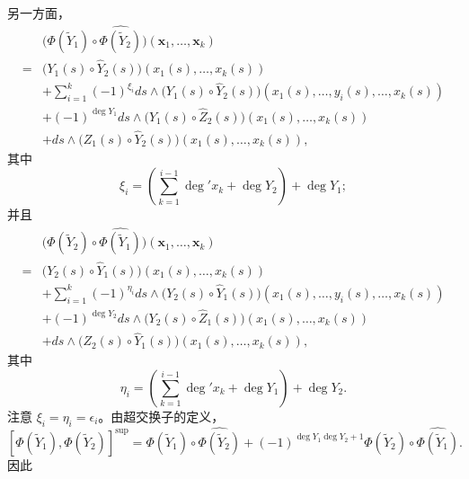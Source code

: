 另一方面，
\begingroup\small
\[
\begin{aligned}
 &\bigl(\Phi(\widetilde Y_1)\circ
   \widehat{\Phi(\widetilde Y_2)}\bigr)
   (\mathbf x_1,\ldots,\mathbf x_k)\\
={}&\bigl(Y_1(s)\circ\widehat Y_2(s)\bigr)
    (x_1(s),\ldots,x_k(s))\\
 &+\sum_{i=1}^k(-1)^{\xi_i}ds\wedge
   \bigl(Y_1(s)\circ\widehat Y_2(s)\bigr)
   (x_1(s),\ldots,y_i(s),\ldots,x_k(s))\\
 &+(-1)^{\deg Y_1}ds\wedge
   \bigl(Y_1(s)\circ\widehat Z_2(s)\bigr)
   (x_1(s),\ldots,x_k(s))\\
 &+ds\wedge\bigl(Z_1(s)\circ\widehat Y_2(s)\bigr)
   (x_1(s),\ldots,x_k(s)),
\end{aligned}
\]
\endgroup
其中
\[
 \xi_i=\left(\sum_{k=1}^{i-1}\deg' x_k+\deg Y_2\right)+\deg Y_1;
\]
并且
\begingroup\small
\[
\begin{aligned}
 &\bigl(\Phi(\widetilde Y_2)\circ
   \widehat{\Phi(\widetilde Y_1)}\bigr)
   (\mathbf x_1,\ldots,\mathbf x_k)\\
={}&\bigl(Y_2(s)\circ\widehat Y_1(s)\bigr)
    (x_1(s),\ldots,x_k(s))\\
 &+\sum_{i=1}^k(-1)^{\eta_i}ds\wedge
   \bigl(Y_2(s)\circ\widehat Y_1(s)\bigr)
   (x_1(s),\ldots,y_i(s),\ldots,x_k(s))\\
 &+(-1)^{\deg Y_2}ds\wedge
   \bigl(Y_2(s)\circ\widehat Z_1(s)\bigr)
   (x_1(s),\ldots,x_k(s))\\
 &+ds\wedge\bigl(Z_2(s)\circ\widehat Y_1(s)\bigr)
   (x_1(s),\ldots,x_k(s)),
\end{aligned}
\]
\endgroup
其中
\[
 \eta_i=\left(\sum_{k=1}^{i-1}\deg' x_k+\deg Y_1\right)+\deg Y_2.
\]
注意 $\xi_i=\eta_i=\epsilon_i$。由超交换子的定义，
\[
 [\Phi(\widetilde Y_1),\Phi(\widetilde Y_2)]^{\mathrm{sup}}
 =\Phi(\widetilde Y_1)\circ\widehat{\Phi(\widetilde Y_2)}
 +(-1)^{\deg Y_1\deg Y_2+1}
  \Phi(\widetilde Y_2)\circ\widehat{\Phi(\widetilde Y_1)}.
\]
因此
\begingroup\small
